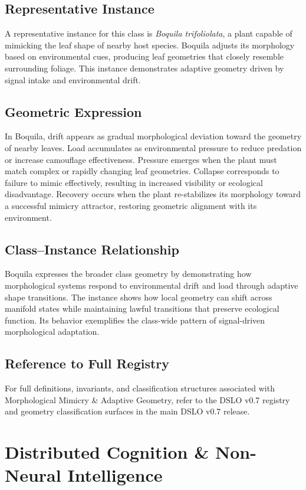 \subsection{Representative Instance}
A representative instance for this class is \emph{Boquila trifoliolata}, a plant capable of mimicking the 
leaf shape of nearby host species. Boquila adjusts its morphology based on environmental cues, producing 
leaf geometries that closely resemble surrounding foliage. This instance demonstrates adaptive geometry 
driven by signal intake and environmental drift.

\subsection{Geometric Expression}
In Boquila, drift appears as gradual morphological deviation toward the geometry of nearby leaves. Load 
accumulates as environmental pressure to reduce predation or increase camouflage effectiveness. Pressure 
emerges when the plant must match complex or rapidly changing leaf geometries. Collapse corresponds to 
failure to mimic effectively, resulting in increased visibility or ecological disadvantage. Recovery occurs 
when the plant re-stabilizes its morphology toward a successful mimicry attractor, restoring geometric 
alignment with its environment.

\subsection{Class--Instance Relationship}
Boquila expresses the broader class geometry by demonstrating how morphological systems respond to 
environmental drift and load through adaptive shape transitions. The instance shows how local geometry 
can shift across manifold states while maintaining lawful transitions that preserve ecological function. 
Its behavior exemplifies the class-wide pattern of signal-driven morphological adaptation.

\subsection{Reference to Full Registry}
For full definitions, invariants, and classification structures associated with Morphological Mimicry \& 
Adaptive Geometry, refer to the DSLO v0.7 registry and geometry classification surfaces in the main 
DSLO v0.7 release.

\section{Distributed Cognition \& Non-Neural Intelligence}
\label{sec:distributed-cognition}

